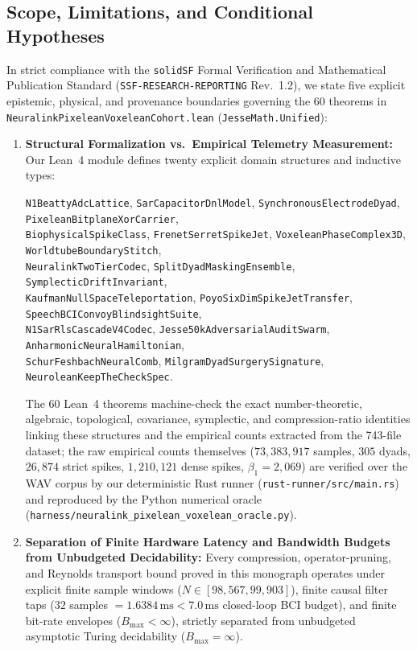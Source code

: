 \documentclass[11pt,letterpaper]{article}
\newcommand{\lean}[1]{\nolinkurl{#1}}
\theoremstyle{definition}
\begin{document}
\subsection[Scope, Limitations, and Conditional Hypotheses]{Scope, Limitations, and Conditional Hypotheses}\label{sec:scope}

In strict compliance with the \texttt{solidSF} Formal Verification and Mathematical Publication Standard (\texttt{SSF-RESEARCH-REPORTING} Rev.~1.2), we state five explicit epistemic, physical, and provenance boundaries governing the 60 theorems in \nolinkurl{NeuralinkPixeleanVoxeleanCohort.lean} (\nolinkurl{JesseMath.Unified}):
\begin{enumerate}
  \item \textbf{Structural Formalization vs.\ Empirical Telemetry Measurement:} Our Lean~4 module defines twenty explicit domain structures and inductive types:
  \begin{center}
  \footnotesize
  \lean{N1BeattyAdcLattice}, \lean{SarCapacitorDnlModel}, \lean{SynchronousElectrodeDyad}, \lean{PixeleanBitplaneXorCarrier},\\
  \lean{BiophysicalSpikeClass}, \lean{FrenetSerretSpikeJet}, \lean{VoxeleanPhaseComplex3D}, \lean{WorldtubeBoundaryStitch},\\
  \lean{NeuralinkTwoTierCodec}, \lean{SplitDyadMaskingEnsemble}, \lean{SymplecticDriftInvariant},\\
  \lean{KaufmanNullSpaceTeleportation}, \lean{PoyoSixDimSpikeJetTransfer}, \lean{SpeechBCIConvoyBlindsightSuite},\\
  \lean{N1SarRlsCascadeV4Codec}, \lean{Jesse50kAdversarialAuditSwarm}, \lean{AnharmonicNeuralHamiltonian},\\
  \lean{SchurFeshbachNeuralComb}, \lean{MilgramDyadSurgerySignature}, \lean{NeuroleanKeepTheCheckSpec}.
  \end{center}
  The 60 Lean~4 theorems machine-check the exact number-theoretic, algebraic, topological, covariance, symplectic, and compression-ratio identities linking these structures and the empirical counts extracted from the 743-file dataset; the raw empirical counts themselves ($73{,}383{,}917$ samples, $305$ dyads, $26{,}874$ strict spikes, $1{,}210{,}121$ dense spikes, $\beta_1 = 2{,}069$) are verified over the WAV corpus by our deterministic Rust runner (\nolinkurl{rust-runner/src/main.rs}) and reproduced by the Python numerical oracle (\nolinkurl{harness/neuralink_pixelean_voxelean_oracle.py}).
  \item \textbf{Separation of Finite Hardware Latency and Bandwidth Budgets from Unbudgeted Decidability:} Every compression, operator-pruning, and Reynolds transport bound proved in this monograph operates under explicit finite sample windows ($N \in [98{,}567, 99{,}903]$), finite causal filter taps ($32$ samples $= 1.6384\,\text{ms} < 7.0\,\text{ms}$ closed-loop BCI budget), and finite bit-rate envelopes ($B_{\max} < \infty$), strictly separated from unbudgeted asymptotic Turing decidability ($B_{\max} = \infty$).

\end{enumerate}
\end{document}
